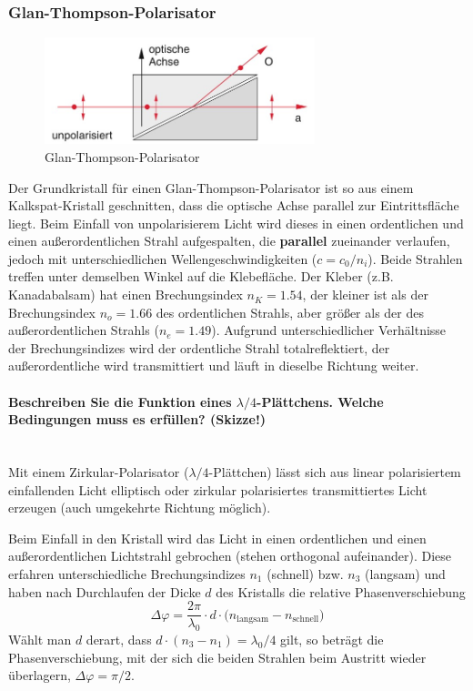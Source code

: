 \documentclass[a4paper, 11pt, ngerman, parskip=half-]{scrartcl}
\newcommand{\myparagraph}[1]{\paragraph{#1}\mbox{}\\}
\begin{document}
\subsubsection*{Glan-Thompson-Polarisator}
%
\begin{figure}[H]
    \centering
    \begin{samepage}
        \includegraphics[width=0.7\textwidth]{image/15/Glan-Thompson.jpg}
        \caption{Glan-Thompson-Polarisator}
        \label{fig:Glan-Thompson-Polarisator}
    \end{samepage}
\end{figure}
%
Der Grundkristall für einen Glan-Thompson-Polarisator ist so aus einem Kalkspat-Kristall geschnitten, dass die optische Achse parallel zur Eintrittsfläche liegt. Beim Einfall von unpolarisierem Licht wird dieses in einen ordentlichen und einen außerordentlichen Strahl aufgespalten, die \textbf{parallel} zueinander verlaufen, jedoch mit unterschiedlichen Wellengeschwindigkeiten ($c = c_0 / n_i$). Beide Strahlen treffen unter demselben Winkel auf die Klebefläche.
Der Kleber (z.B. Kanadabalsam) hat einen Brechungsindex $n_K = \num{1.54}$, der kleiner ist als der Brechungsindex $n_o = \num{1.66}$ des
ordentlichen Strahls, aber größer als der des außerordentlichen Strahls ($n_e = \num{1.49}$). Aufgrund unterschiedlicher Verhältnisse der Brechungsindizes wird der ordentliche Strahl totalreflektiert, der außerordentliche wird transmittiert und läuft in dieselbe Richtung weiter.


\myparagraph{Beschreiben Sie die Funktion eines $\lambda/4$-Plättchens. Welche Bedingungen muss es erfüllen? (Skizze!)}
%
Mit einem Zirkular-Polarisator ($\lambda/4$-Plättchen) lässt sich aus linear polarisiertem einfallenden Licht elliptisch oder zirkular polarisiertes transmittiertes Licht erzeugen (auch umgekehrte Richtung möglich).

Beim Einfall in den Kristall wird das Licht in einen ordentlichen und einen außerordentlichen Lichtstrahl gebrochen (stehen orthogonal aufeinander). Diese erfahren unterschiedliche Brechungsindizes $n_1$ (schnell) bzw. $n_3$ (langsam) und haben nach Durchlaufen der Dicke $d$ des Kristalls die relative Phasenverschiebung
%
\[\Delta \varphi = \frac{2\pi}{\lambda_0} \cdot d \cdot \bigg( n_{\text{langsam}} - n_{\text{schnell}} \bigg) \]
%
Wählt man $d$ derart, dass $d \cdot (n_3 - n_1) = \lambda_0/4$ gilt, so beträgt die Phasenverschiebung, mit der sich die beiden Strahlen beim Austritt wieder überlagern, $\Delta \varphi = \pi/2$.
\end{document}

